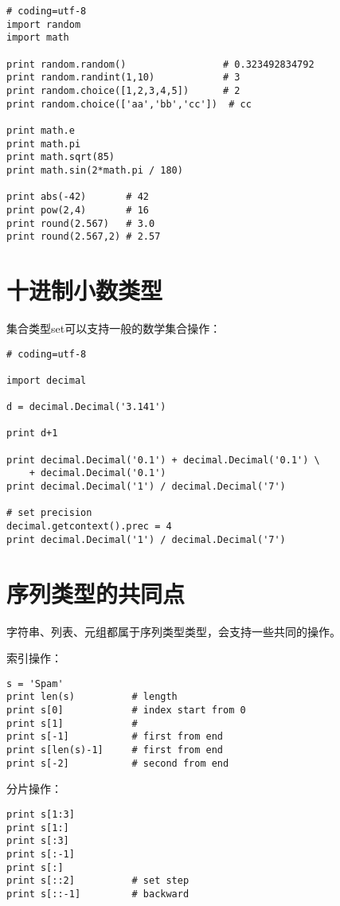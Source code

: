 \begin{lstlisting}
# coding=utf-8
import random
import math

print random.random()                 # 0.323492834792
print random.randint(1,10)            # 3
print random.choice([1,2,3,4,5])      # 2
print random.choice(['aa','bb','cc'])  # cc

print math.e
print math.pi
print math.sqrt(85)
print math.sin(2*math.pi / 180)

print abs(-42)       # 42
print pow(2,4)       # 16
print round(2.567)   # 3.0
print round(2.567,2) # 2.57
\end{lstlisting}

\section{十进制小数类型}

集合类型set可以支持一般的数学集合操作：

\begin{lstlisting}
# coding=utf-8

import decimal

d = decimal.Decimal('3.141')

print d+1

print decimal.Decimal('0.1') + decimal.Decimal('0.1') \
	+ decimal.Decimal('0.1') 
print decimal.Decimal('1') / decimal.Decimal('7') 

# set precision
decimal.getcontext().prec = 4
print decimal.Decimal('1') / decimal.Decimal('7') 
\end{lstlisting}

\section{序列类型的共同点}

字符串、列表、元组都属于序列类型类型，会支持一些共同的操作。

索引操作：
\begin{lstlisting}
s = 'Spam'
print len(s)          # length
print s[0]            # index start from 0
print s[1]            # 
print s[-1]           # first from end
print s[len(s)-1]     # first from end
print s[-2]           # second from end
\end{lstlisting}

分片操作：
\begin{lstlisting}
print s[1:3]
print s[1:]
print s[:3]
print s[:-1]
print s[:]
print s[::2]          # set step
print s[::-1]         # backward
\end{lstlisting}


